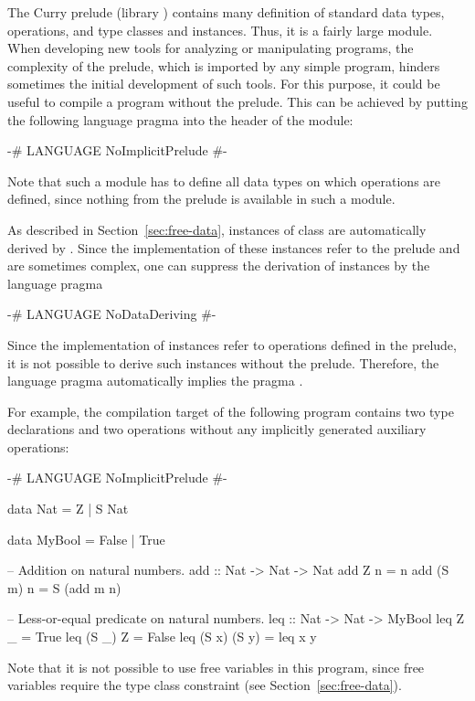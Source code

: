 The Curry prelude (library ) contains
many definition of standard data types, operations,
and type classes and instances.
Thus, it is a fairly large module.
When developing new tools for analyzing or manipulating programs,
the complexity of the prelude, which is imported by any simple program,
hinders sometimes the initial development of such tools.
For this purpose, it could be useful to compile a program without
the prelude.
This can be achieved by putting the following language pragma
into the  header of the module:
%
\begin{curry}
{-# LANGUAGE NoImplicitPrelude #-}
\end{curry}
%
Note that such a module has to define all data types
on which operations are defined, since nothing from the prelude
is available in such a module.

As described in Section~\ref{sec:free-data},
instances of class  are automatically derived by \CYS.
Since the implementation of these instances refer to the prelude
and are sometimes complex, one can suppress the derivation
of  instances by the language pragma
%
\begin{curry}
{-# LANGUAGE NoDataDeriving #-}
\end{curry}
%
Since the implementation of  instances refer
to operations defined in the prelude, it is not possible
to derive such instances without the prelude.
Therefore, the language pragma 
automatically implies the pragma .

For example, the compilation target of the following program
contains two type declarations and two operations
without any implicitly generated auxiliary operations:
%
\begin{curry}
{-# LANGUAGE NoImplicitPrelude #-}

data Nat = Z | S Nat

data MyBool = False | True

-- Addition on natural numbers.
add         :: Nat -> Nat -> Nat
add Z     n = n
add (S m) n = S (add m n)

-- Less-or-equal predicate on natural numbers.
leq :: Nat -> Nat -> MyBool
leq Z     _     = True
leq (S _) Z     = False
leq (S x) (S y) = leq x y
\end{curry}
%
Note that it is not possible to use free variables in this program,
since free variables require the type class constraint 
(see Section~\ref{sec:free-data}).

